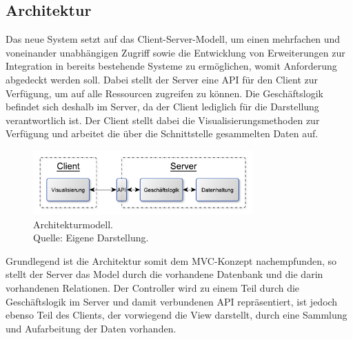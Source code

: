 \subsection{Architektur}


Das neue System setzt auf das Client-Server-Modell, um einen mehrfachen und voneinander unabhängigen Zugriff sowie die Entwicklung von Erweiterungen zur Integration in bereits bestehende Systeme zu ermöglichen, womit Anforderung 
abgedeckt werden soll.
Dabei stellt der Server eine \ac{API} für den Client zur Verfügung, um auf alle Ressourcen zugreifen zu können.
Die Geschäftslogik befindet sich deshalb im Server, da der Client lediglich für die Darstellung verantwortlich ist.
Der Client stellt dabei die Visualisierungsmethoden zur Verfügung und arbeitet die über die Schnittstelle gesammelten Daten auf.

\begin{figure}[h]
  \centering
  \includegraphics[width=0.75\textwidth]{img/konzeption/gesamtkonzept/Architektur.pdf}
  \captionsetup{format=hang,justification=raggedright,singlelinecheck=false}
  \caption[Architekturmodell]{Architekturmodell. \\Quelle: Eigene Darstellung.}
  \label{img:einkaufBPMN}
\end{figure}

Grundlegend ist die Architektur somit dem \ac{MVC}-Konzept nachempfunden, so stellt der Server das Model durch die vorhandene Datenbank und die darin vorhandenen Relationen.
Der Controller wird zu einem Teil durch die Geschäftslogik im Server und damit verbundenen \ac{API} repräsentiert, ist jedoch ebenso Teil des Clients, der vorwiegend die View darstellt, durch eine Sammlung und Aufarbeitung der Daten vorhanden.\autocite{rf-leff2001web}
